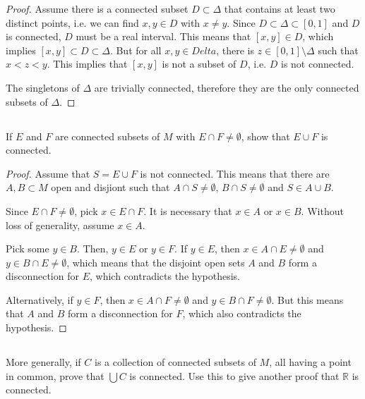 \begin{proof}
Assume there is a connected subset $D \subset \Delta$ that contains at least two distinct points, i.e. we can find $x,y \in D$ with $x\neq y$. Since $D \subset \Delta \subset [0,1]$ and $D$ is connected, $D$ must be a real interval. This means that $[x,y] \in D$, which implies $[x,y] \subset D \subset \Delta$. But for all $x,y \in Delta$, there is $z \in [0,1] \setminus \Delta$ such that $x < z < y$. This implies that $[x,y]$ is not a subset of $D$, i.e. $D$ is not connected.

The singletons of $\Delta$ are trivially connected, therefore they are the only connected subsets of $\Delta$.
\end{proof}

   


\subsection{} If $E$ and $F$ are connected subsets of $M$ with $E \cap F  \neq \emptyset$, show that $E \cup F$ is connected. 

\begin{proof}
Assume that $S = E \cup F$ is not connected. This means that there are $A,B \subset M$ open and disjiont such that $A \cap S \neq \emptyset$, $B \cap S \neq \emptyset$ and $S \in A \cup B$.

Since $E \cap F \neq \emptyset$, pick $x \in E \cap F$. It is necessary that $x \in A$ or $x \in B$. Without loss of generality, assume $x \in A$.

Pick some $y \in B$. Then, $y \in E$ or $y \in F$. If $y \in E$, then $x \in A \cap E \neq \emptyset$ and $y \in B \cap E \neq \emptyset$, which means that the disjoint open sets $A$ and $B$ form a disconnection for $E$, which contradicts the hypothesis. 

Alternatively, if $y \in F$, then $x \in A \cap F \neq \emptyset$ and $y \in B \cap F \neq \emptyset$. But this means that $A$ and $B$ form a disconnection for $F$, which also contradicts the hypothesis.

\end{proof}

\subsection{} More generally, if $C$ is a collection of connected subsets of $M$, all having a point in common, prove that $\bigcup C$ is connected. Use this to give another proof that $\mathbb{R}$ is connected.

